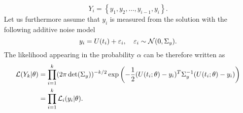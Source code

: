 \begin{equation}
	Y_i = \left\{y_1, y_2, \ldots, y_{i-1}, y_i \right\}.
\end{equation}
Let us furthermore assume that $y_i$ is measured from the solution with the following additive noise model
\begin{equation}
	y_i = U(t_i) + \varepsilon_i, \quad \varepsilon_i \sim \mathcal{N}(0, \Sigma_y).
\end{equation}
The likelihood appearing in the probability $\alpha$ can be therefore written as
\begin{equation}
\begin{aligned}
	\mathcal{L}(Y_k|\theta) &= \prod_{i=1}^{k} (2\pi\det(\Sigma_y))^{-k/2}\exp\left(-\frac{1}{2}(U(t_i;\theta) - y_i)^T\Sigma_y^{-1}(U(t_i;\theta) - y_i)\right) \\
					   &= \prod_{i=1}^{k} \mathcal{L}_i(y_i|\theta).
\end{aligned}
\end{equation}


